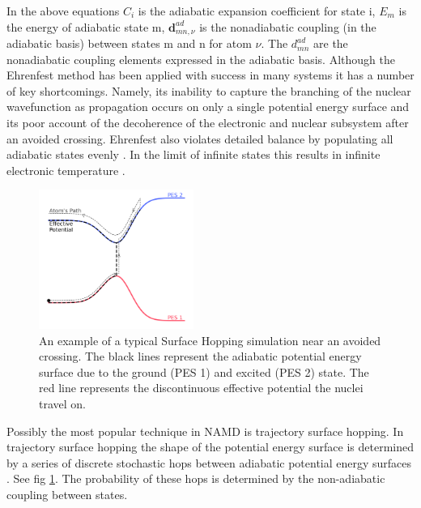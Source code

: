 In the above equations $C_{i}$ is the adiabatic expansion coefficient for state i, $E_{m}$ is the energy of adiabatic state m, $\textbf{d}_{mn, \nu}^{ad}$ is the nonadiabatic coupling (in the adiabatic basis) between states m and n for atom $\nu$. The $d_{mn}^{ad}$ are the nonadiabatic coupling elements expressed in the adiabatic basis.
Although the Ehrenfest method has been applied with success in many systems \cite{Li2005Aug, Saita2012Dec, Kohen1998Sep} it has a number of key shortcomings. Namely, its inability to capture the branching of the nuclear wavefunction as propagation occurs on only a single potential energy surface and its poor account of the decoherence of the electronic and nuclear subsystem after an avoided crossing. Ehrenfest also violates detailed balance by populating all adiabatic states evenly \cite{tully_perspective:_2012, john_c._tully_nonadiabatic_nodate}. In the limit of infinite states this results in infinite electronic temperature \cite{parandekar_detailed_2006}.
\begin{figure}
  \includegraphics[width=0.45\textwidth]{./img/SH_hop.png}
  \caption{\label{fig:SH_diag}An example of a typical Surface Hopping simulation near an avoided crossing. The black lines represent the adiabatic potential energy surface due to the ground (PES 1) and excited (PES 2) state. The red line represents the discontinuous effective potential the nuclei travel on.}
\end{figure}
\noindent Possibly the most popular technique in NAMD is trajectory surface hopping. In trajectory surface hopping the shape of the potential energy surface is determined by a series of discrete stochastic hops between adiabatic potential energy surfaces \cite{tully_perspective:_2012}. See fig \ref{fig:SH_diag}.  The probability of these hops is determined by the non-adiabatic coupling between states.
